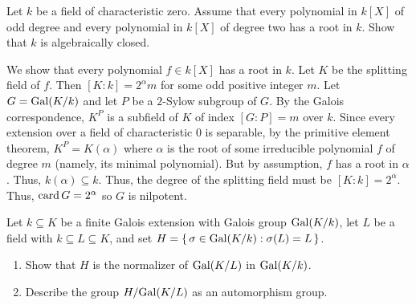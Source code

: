 \begin{problem}
  Let \(k\) be a field of characteristic zero. Assume that every polynomial
  in \(k[X]\) of odd degree and every polynomial in \(k[X]\) of degree two
  has a root in \(k\). Show that \(k\) is algebraically closed.
\end{problem}
\begin{solution}
  We show that every polynomial \(f\in k[X]\) has a root in \(k\). Let
  \(K\) be the splitting field of \(f\). Then \([K:k]=2^\alpha m\) for some
  odd positive integer \(m\). Let \(G=\operatorname{Gal}(K/k)\) and let \(P\) be a
  \(2\)-Sylow subgroup of \(G\). By the Galois correspondence, \(K^P\) is a
  subfield of \(K\) of index \([G:P]=m\) over \(k\). Since every extension
  over a field of characteristic \(0\) is separable, by the primitive
  element theorem, \(K^P=K(\alpha)\) where \(\alpha\) is the root of some
  irreducible polynomial \(f\) of degree \(m\) (namely, its minimal
  polynomial). But by assumption, \(f\) has a root in \(\alpha\). Thus,
  \(k(\alpha)\subseteq k\). Thus, the degree of the splitting field must be
  \([K:k]=2^\alpha\). Thus, \(\operatorname{card} G=2^\alpha\) so \(G\) is nilpotent.
\end{solution}

\begin{problem}
  Let \(k\subseteq K\) be a finite Galois extension with Galois group
  \(\operatorname{Gal}(K/k)\), let \(L\) be a field with \( k\subseteq L\subseteq K\),
  and set \(H=\left\{\,\sigma\in\operatorname{Gal}(K/k):\sigma(L)=L\,\right\}\).
  \begin{enumerate}[label=(\alph*)]
  \item Show that \(H\) is the normalizer of \(\operatorname{Gal}(K/L)\) in
    \(\operatorname{Gal}(K/k)\).
  \item Describe the group \(H/{\operatorname{Gal}(K/L)}\) as an automorphism group.
  \end{enumerate}
\end{problem}
\begin{solution}
\end{solution}


